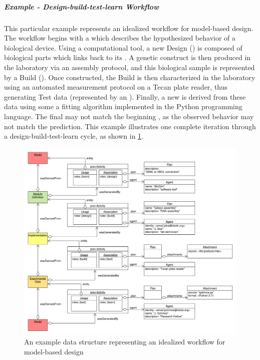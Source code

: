 \subparagraph{Example - Design-build-test-learn Workflow}

This particular example represents an idealized workflow for model-based design. The workflow begins with a  which describes the hypothesized behavior of a biological device. Using a computational tool, a new Design () is composed of biological parts which links back to its . A genetic construct is then produced in the laboratory via an assembly protocol, and this biological sample is represented by a Build (). Once constructed, the Build is then characterized in the laboratory using an automated measurement protocol on a Tecan plate reader, thus generating Test data (represented by an ). Finally, a new  is derived from these data using some a fitting algorithm implemented in the Python programming language. The final  may not match the beginning , as the observed behavior may not match the prediction. This example illustrates one complete iteration through a design-build-test-learn cycle, as shown in \ref{images:design-build-test-learn}.

\begin{figure}[ht]
\begin{center}
\includegraphics[width=\linewidth]{uml/design-build-test}
\caption[]{An example data structure representing an idealized workflow for model-based
design}
\label{images:design-build-test-learn}
\end{center}
\end{figure}

